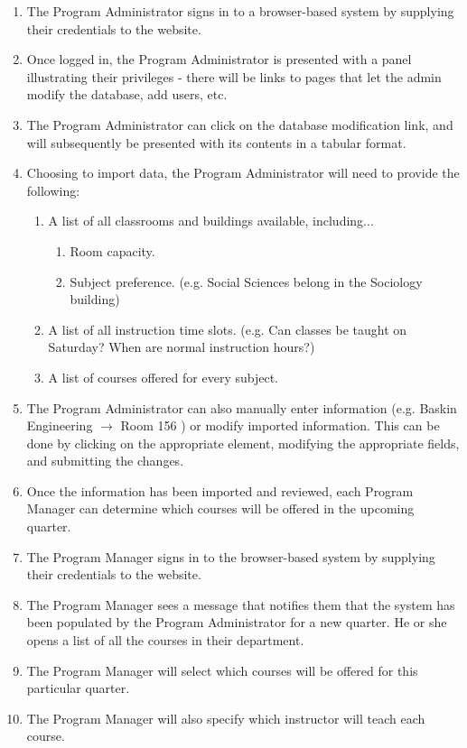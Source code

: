 \documentclass[12pt]{article}
\begin{document}
\begin{enumerate}
\item	The Program Administrator signs in to a browser-based system by supplying their credentials to the website.
\item	Once logged in, the Program Administrator is presented with a panel illustrating their privileges - there will be links to pages that let the admin modify the database, add users, etc.
\item	The Program Administrator can click on the database modification link, and will subsequently be presented with its contents in a tabular format.
\item	Choosing to import data, the Program Administrator will need to provide the following: 
	\begin{enumerate}
	\item	A list of all classrooms and buildings available, including...
		\begin{enumerate}	
		\item Room capacity.
		\item Subject preference. (e.g. Social Sciences belong in the Sociology building)
		\end{enumerate}
	\item	A list of all instruction time slots. (e.g. Can classes be taught on Saturday? When are normal instruction hours?)
	\item	A list of courses offered for every subject. 
	\end{enumerate}
\item	The Program Administrator can also manually enter information (e.g. Baskin Engineering $\to$ Room 156 ) or modify imported information. This can be done by clicking on the appropriate element, modifying the appropriate fields, and submitting the changes.
\item	Once the information has been imported and reviewed, each Program Manager can determine which courses will be offered in the upcoming quarter.
\item The Program Manager signs in to the browser-based system by supplying their credentials to the website.
\item The Program Manager sees a message that notifies them that the system has been populated by the Program Administrator for a new quarter. He or she opens a list of all the courses in their department.
\item The Program Manager will select which courses will be offered for this particular quarter.
\item The Program Manager will also specify which instructor will teach each course.

\end{enumerate}
\end{document}
